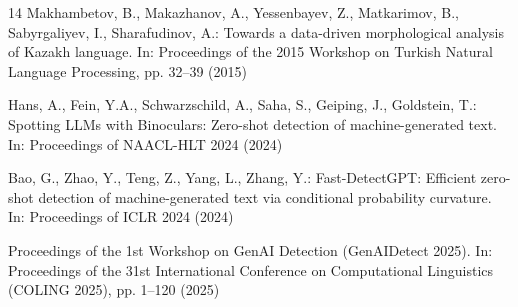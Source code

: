 \documentclass[runningheads]{llncs}
\begin{document}
\begin{thebibliography}{14}
Makhambetov, B., Makazhanov, A., Yessenbayev, Z., Matkarimov, B., Sabyrgaliyev, I., Sharafudinov, A.: Towards a data-driven morphological analysis of Kazakh language. In: Proceedings of the 2015 Workshop on Turkish Natural Language Processing, pp. 32--39 (2015)

Hans, A., Fein, Y.A., Schwarzschild, A., Saha, S., Geiping, J., Goldstein, T.: Spotting LLMs with Binoculars: Zero-shot detection of machine-generated text. In: Proceedings of NAACL-HLT 2024 (2024)

Bao, G., Zhao, Y., Teng, Z., Yang, L., Zhang, Y.: Fast-DetectGPT: Efficient zero-shot detection of machine-generated text via conditional probability curvature. In: Proceedings of ICLR 2024 (2024)

Proceedings of the 1st Workshop on GenAI Detection (GenAIDetect 2025). In: Proceedings of the 31st International Conference on Computational Linguistics (COLING 2025), pp. 1--120 (2025)

\end{thebibliography}
\end{document}
